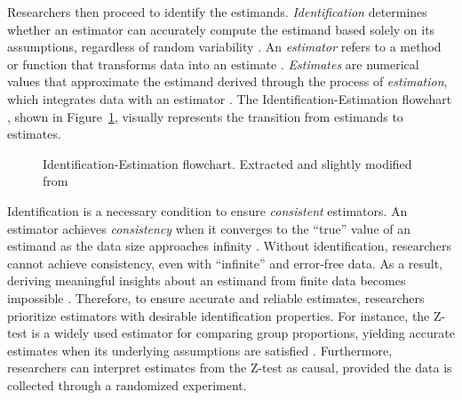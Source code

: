 \documentclass[
  authoryear,
  review,
  1p]{elsarticle}
\begin{document}
Researchers then proceed to identify the estimands.
\emph{Identification} determines whether an estimator can accurately
compute the estimand based solely on its assumptions, regardless of
random variability \citep[p.~4]{Schuessler_et_al_2023}. An
\emph{estimator} refers to a method or function that transforms data
into an estimate \citep{Neal_2020}. \emph{Estimates} are numerical
values that approximate the estimand derived through the process of
\emph{estimation}, which integrates data with an estimator
\citep{Everitt_et_al_2010}. The Identification-Estimation flowchart
\citep{McElreath_2020, Neal_2020}, shown in Figure~\ref{fig-IEflow},
visually represents the transition from estimands to estimates.

\begin{figure}


\caption{\label{fig-IEflow}Identification-Estimation flowchart.
Extracted and slightly modified from \citet[p.~32]{Neal_2020}}

\end{figure}%

Identification is a necessary condition to ensure \emph{consistent}
estimators. An estimator achieves \emph{consistency} when it converges
to the ``true'' value of an estimand as the data size approaches
infinity \citep{Everitt_et_al_2010}. Without identification, researchers
cannot achieve consistency, even with ``infinite'' and error-free data.
As a result, deriving meaningful insights about an estimand from finite
data becomes impossible \citep[p.~5]{Schuessler_et_al_2023}. Therefore,
to ensure accurate and reliable estimates, researchers prioritize
estimators with desirable identification properties. For instance, the
Z-test is a widely used estimator for comparing group proportions,
yielding accurate estimates when its underlying assumptions are
satisfied \citep{Kanji_2006}. Furthermore, researchers can interpret
estimates from the Z-test as causal, provided the data is collected
through a randomized experiment.
\end{document}
